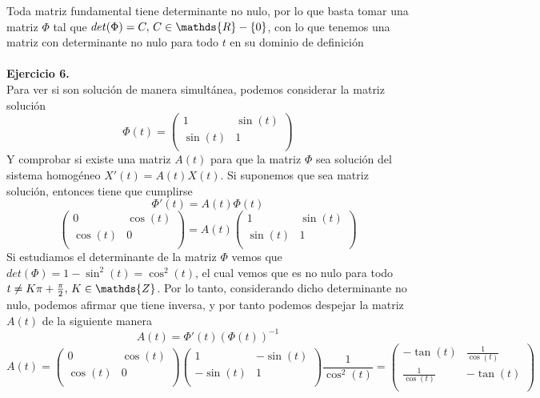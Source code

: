 \documentclass[fleqn]{article}
\def\R{\mathds{R}}
\def\Z{\mathds{Z}}
\begin{document}
    
    
    Toda matriz fundamental tiene determinante no nulo, por lo que basta tomar una matriz $\Phi$ tal que $det(\Phi) = C, \thinspace C \in \R-\{0\}$,
    con lo que tenemos una matriz con determinante no nulo para todo $t$ en su dominio de definición\\ \\

    \textbf{Ejercicio 6. } \\

    Para ver si son solución de manera simultánea, podemos considerar la matriz solución 
    $$\Phi (t) = \begin{pmatrix}
        1 & \sin(t)\\
        \sin(t) & 1\\
    \end{pmatrix}$$
    Y comprobar si existe una matriz $A(t)$ para que la matriz $\Phi$ sea solución del sistema homogéneo $X'(t) = A(t) X(t)$. Si suponemos que sea matriz solución,
    entonces tiene que cumplirse
    $$\Phi' (t) = A(t) \Phi(t)$$
    $$
    \begin{pmatrix}
        0 & \cos(t)\\
        \cos(t) & 0\\
    \end{pmatrix} 
    = A(t)
    \begin{pmatrix}
        1 & \sin(t)\\
        \sin(t) & 1\\
    \end{pmatrix}
    $$
    Si estudiamos el determinante de la matriz $\Phi$ vemos que $det(\Phi)=1-\sin^2(t)=\cos^2(t)$, el cual vemos que es no nulo para todo 
    $t\neq K\pi + \frac{\pi}{2}, \thinspace K\in\Z$. Por lo tanto, considerando dicho determinante no nulo, podemos afirmar que tiene inversa, y por tanto 
    podemos despejar la matriz $A(t)$ de la siguiente manera
    $$A(t) = \Phi' (t) (\Phi(t))^{-1}$$
    $$A(t) = 
    \begin{pmatrix}
        0 & \cos(t)\\
        \cos(t) & 0\\
    \end{pmatrix} 
    \begin{pmatrix}
        1 & -\sin(t)\\
        -\sin(t) & 1\\
    \end{pmatrix}
    \frac{1}{\cos^2(t)} = 
    \begin{pmatrix}
        -\tan(t) & \frac{1}{\cos(t)}\\
        \frac{1}{\cos(t)} & -\tan(t)\\
    \end{pmatrix}
    $$
\end{document}
